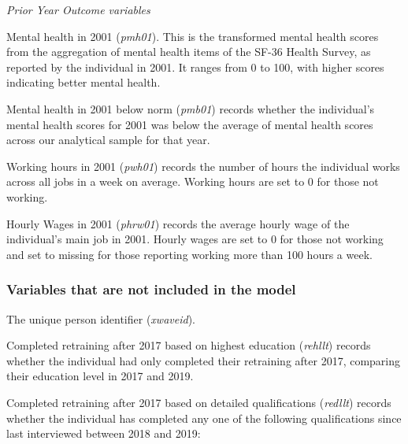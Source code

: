 \documentclass[12pt, a4paper]{article}
\begin{document}
\emph{Prior Year Outcome variables}

Mental health in 2001 (\textit{p\textunderscore{}mh01}). This is the transformed mental health scores from the aggregation of mental health items of the SF-36 Health Survey, as reported by the individual in 2001. It ranges from 0 to 100, with higher scores indicating better mental health.   

Mental health in 2001 below norm (\textit{p\textunderscore{}mb01}) records whether the individual’s mental health scores for 2001 was below the average of mental health scores across our analytical sample for that year. 

Working hours in 2001 (\textit{p\textunderscore{}wh01}) records the number of hours the individual works across all jobs in a week on average. Working hours are set to 0 for those not working.

Hourly Wages in 2001 (\textit{p\textunderscore{}hrw01}) records the average hourly wage of the individual’s main job in 2001. Hourly wages are set to 0 for those not working and set to missing for those reporting working more than 100 hours a week. 

\subsubsection{Variables that are not included in the model}

The unique person identifier (\textit{xwaveid}).

Completed retraining after 2017 based on highest education (\textit{rehllt}) records whether the individual had only completed their retraining after 2017, comparing their education level in 2017 and 2019.

Completed retraining after 2017 based on detailed qualifications (\textit{redllt}) records whether the individual has completed any one of the following qualifications since last interviewed between 2018 and 2019:
\end{document}
